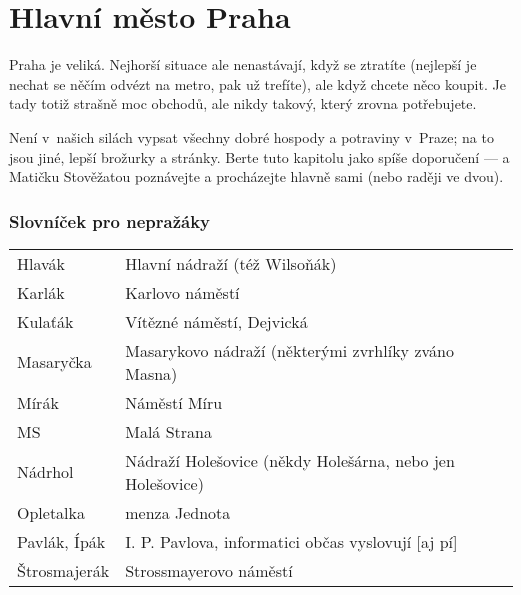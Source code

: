 \section{Hlavní město Praha}

Praha je veliká. Nejhorší situace ale nenastávají, když se ztratíte (nejlepší
je nechat se něčím odvézt na metro, pak už trefíte), ale když chcete něco
koupit. Je tady totiž strašně moc obchodů, ale nikdy takový, který zrovna
potřebujete.

Není v~našich silách vypsat všechny dobré hospody a potraviny v~Praze; na to jsou jiné, lepší brožurky a stránky. Berte tuto kapitolu jako spíše doporučení --- a Matičku Stověžatou poznávejte a procházejte hlavně sami (nebo raději ve dvou).

\subsubsection{Slovníček pro nepražáky}

\noindent\begin{tabularx}{\textwidth}{ l X }
   Hlavák &  Hlavní nádraží (též Wilsoňák) \\
   Karlák &  Karlovo náměstí \\
   Kulaťák &  Vítězné náměstí, Dejvická \\
   Masaryčka &  Masarykovo nádraží (některými zvrhlíky zváno Masna) \\
   Mírák &  Náměstí Míru \\
   MS &  Malá Strana \\
   Nádrhol &  Nádraží Holešovice (někdy Holešárna, nebo jen Holešovice) \\
   Opletalka &  menza Jednota \\
   Pavlák, Ípák &  I. P. Pavlova, informatici občas vyslovují [aj pí] \\
   Štrosmajerák &  Strossmayerovo náměstí \\
\end{tabularx}
